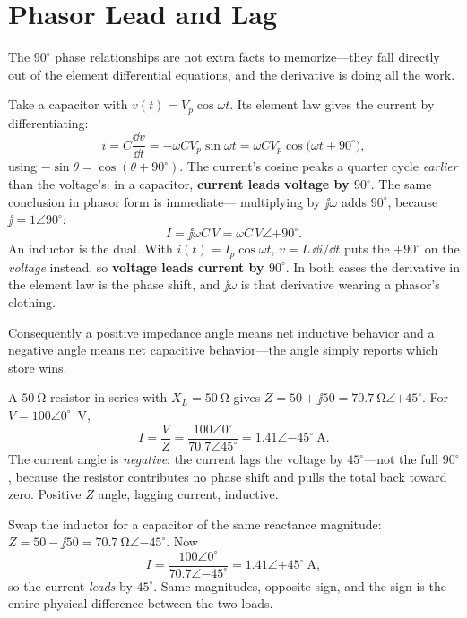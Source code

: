 \section{Phasor Lead and Lag}
The \(90^\circ\) phase relationships are not extra facts to memorize---they fall
directly out of the element differential equations, and the derivative is doing all
the work.

Take a capacitor with \(v(t)=V_p\cos\omega t\). Its element law gives the current by
differentiating:
\[
i=C\frac{\dd v}{\dd t}=-\omega C V_p\sin\omega t
=\omega C V_p\cos\bigl(\omega t+90^\circ\bigr),
\]
using \(-\sin\theta=\cos(\theta+90^\circ)\). The current's cosine peaks a quarter
cycle \emph{earlier} than the voltage's: in a capacitor, \textbf{current leads
voltage by \(90^\circ\)}. The same conclusion in phasor form is immediate---
multiplying by \(\jj\omega\) adds \(90^\circ\), because \(\jj=1\angle90^\circ\):
\[
I=\jj\omega C\,V=\omega C\,V\angle{+90^\circ}.
\]
An inductor is the dual. With \(i(t)=I_p\cos\omega t\),
\(v=L\,\dd i/\dd t\) puts the \(+90^\circ\) on the \emph{voltage} instead, so
\textbf{voltage leads current by \(90^\circ\)}. In both cases the derivative in the
element law is the phase shift, and \(\jj\omega\) is that derivative wearing a
phasor's clothing.
\cite[pp.~18--22, 28--29]{white2004highfrequency}

Consequently a positive impedance angle means net inductive behavior and a negative
angle means net capacitive behavior---the angle simply reports which store wins.

\begin{workedbox}
A \(\SI{50}{\ohm}\) resistor in series with \(X_L=\SI{50}{\ohm}\) gives
\(Z=50+\jj50=\SI{70.7}{\ohm}\angle{+45^\circ}\). For \(V=100\angle0^\circ\)~V,
\[
I=\frac{V}{Z}=\frac{100\angle0^\circ}{70.7\angle45^\circ}
=1.41\angle{-45^\circ}\ \si{\ampere}.
\]
The current angle is \emph{negative}: the current lags the voltage by
\(45^\circ\)---not the full \(90^\circ\), because the resistor contributes no phase
shift and pulls the total back toward zero. Positive \(Z\) angle, lagging current,
inductive.
\end{workedbox}

\begin{workedbox}
Swap the inductor for a capacitor of the same reactance magnitude:
\(Z=50-\jj50=\SI{70.7}{\ohm}\angle{-45^\circ}\). Now
\[
I=\frac{100\angle0^\circ}{70.7\angle{-45^\circ}}
=1.41\angle{+45^\circ}\ \si{\ampere},
\]
so the current \emph{leads} by \(45^\circ\). Same magnitudes, opposite sign, and
the sign is the entire physical difference between the two loads.
\end{workedbox}


